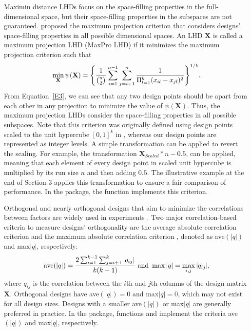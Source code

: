 Maximin distance LHDs focus on the space-filling properties in the full-dimensional space, but their space-filling properties in the subspaces are not guaranteed.  \cite{joseph2015maximum} proposed the maximum projection criterion that considers designs' space-filling properties in all possible dimensional spaces. An LHD $\textbf{X}$ is called a maximum projection LHD (MaxPro LHD) if it minimizes the maximum projection criterion such that
\begin{equation}\label{E3}
	\mathop{\mathrm{min}}\limits_{\textbf{X}} \psi (\textbf{X}) = \Bigg\{ \frac{1}{{n \choose 2}} \sum_{i=1}^{n-1} \sum_{j=i+1}^{n} \frac{1}{\Pi_{l=1}^{k}(x_{il}-x_{jl})^2}  \Bigg\}^{1/k}.
\end{equation}
From Equation~\eqref{E3}, we can see that any two design points should be apart from each other in any projection to minimize the value of $\psi (\textbf{X})$. Thus, the maximum projection LHDs consider the space-filling properties in all possible subspaces. Note that this criterion was originally defined using design points scaled to the unit hypercube $[0,1]^{k}$ in \cite{joseph2015maximum}, whereas our design points are represented as integer levels. A simple transformation can be applied to revert the scaling. For example, the transformation $\textbf{X}_{Scaled}*n-0.5$, can be applied, meaning that each element of every design point in scaled unit hypercube is multiplied by its run size $n$ and then adding $0.5$. The illustrative example at the end of Section 3 applies this transformation to ensure a fair comparison of performance. In the  package, the function  implements this criterion.

Orthogonal and nearly orthogonal designs that aim to minimize the correlations between factors are widely used in experiments \citep{georgiou2009orthogonal, steinberg2006construction, sun2017general}. Two major correlation-based criteria to measure designs' orthogonality are the average absolute correlation criterion and the maximum absolute correlation criterion \citep{georgiou2009orthogonal}, denoted as ave$(|q|)$ and max$|q|$, respectively:
\begin{equation}\label{E4}
	\mathop{\mathrm{ave}}\limits(|q|) = \frac{2 \sum_{i=1}^{k-1} \sum_{j=i+1}^{k}|q_{ij}|}{k(k-1)} \text{ and } \mathop{\mathrm{max}}\limits|q| =  \mathop{\mathrm{max}}\limits_{i,j} |q_{ij}|,
\end{equation}
where $q_{ij}$ is the correlation between the $i$th and $j$th columns of the design matrix $\textbf{X}$.
Orthogonal designs have ave$(|q|)=0$ and max$|q|=0$, which may not exist for all design sizes. Designs with a smaller ave$(|q|)$ or max$|q|$ are generally preferred in practice. In the  package, functions  and  implement the criteria ave$(|q|)$ and max$|q|$, respectively.

